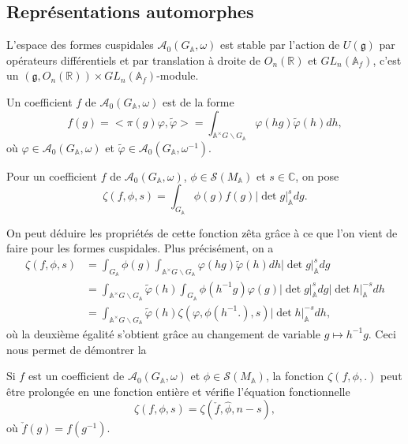 \subsection{Représentations automorphes}

L'espace des formes cuspidales $\mathcal{A}_0(G_\mathbb{A}, \omega)$ est stable par l'action de $U(\mathfrak{g})$ par opérateurs différentiels et par translation à droite de $O_n(\mathbb{R})$ et $GL_n(\mathbb{A}_f)$, c'est un $(\mathfrak{g}, O_n(\mathbb{R})) \times GL_n(\mathbb{A}_f)$-module.

Un coefficient $f$ de $\mathcal{A}_0(G_\mathbb{A}, \omega)$ est de la forme
\begin{equation}
f(g) = <\pi(g)\varphi, \tilde{\varphi}> = \int_{\mathbb{A}^\times G \backslash G_\mathbb{A}} \varphi(hg) \tilde{\varphi}(h) dh,
\end{equation}
où $\varphi \in \mathcal{A}_0(G_\mathbb{A}, \omega)$ et $\tilde{\varphi} \in \mathcal{A}_0(G_\mathbb{A}, \omega^{-1})$.

Pour un coefficient $f$ de $\mathcal{A}_0(G_\mathbb{A}, \omega)$, $\phi \in \mathcal{S}(M_\mathbb{A})$ et $s \in \mathbb{C}$, on pose
\begin{equation}
\zeta(f, \phi, s) = \int_{G_\mathbb{A}} \phi(g) f(g) |\det g|_\mathbb{A}^s dg.
\end{equation}

On peut déduire les propriétés de cette fonction zêta grâce à ce que l'on vient de faire pour les formes cuspidales. Plus précisément, on a
\begin{align}
\zeta(f, \phi, s) &= \int_{G_\mathbb{A}}\phi(g)\int_{\mathbb{A}^\times G \backslash G_\mathbb{A}} \varphi(hg) \tilde{\varphi}(h) dh |\det g|_\mathbb{A}^s dg \\
&= \int_{\mathbb{A}^\times G \backslash G_\mathbb{A}} \tilde{\varphi}(h) \int_{G_\mathbb{A}}\phi(h^{-1}g)\varphi(g)|\det g|_\mathbb{A}^s dg |\det h|_\mathbb{A}^{-s} dh \\
&= \int_{\mathbb{A}^\times G \backslash G_\mathbb{A}} \tilde{\varphi}(h) \zeta(\varphi, \phi(h^{-1}.), s)|\det h|_\mathbb{A}^{-s} dh,
\end{align}
où la deuxième égalité s'obtient grâce au changement de variable $g \mapsto h^{-1}g$. Ceci nous permet de démontrer la
\begin{proposition}
Si $f$ est un coefficient de $\mathcal{A}_0(G_\mathbb{A}, \omega)$ et $\phi \in \mathcal{S}(M_\mathbb{A})$, la fonction $\zeta(f, \phi, .)$ peut être prolongée en une fonction entière et vérifie l'équation fonctionnelle
\begin{equation}
\zeta(f, \phi, s) = \zeta(\check{f}, \hat{\phi}, n-s),
\end{equation}
où $\check{f}(g) = f(g^{-1})$.
\end{proposition}

